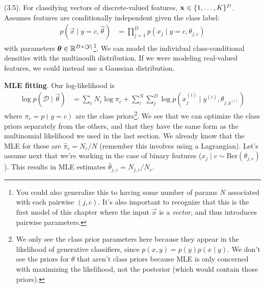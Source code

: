 \documentclass[11pt]{article}
\begin{document}
\myspace
\p {} (3.5). For classifying vectors of discrete-valued features, $\mathbf{x}_{} \in \{1, \ldots, K\}^D$. Assumes features are conditionally independent given the class label:
\begin{align}
	p(\vec x \mid y=c, \vec\theta) 
		&= \prod_{j=1}^{D} p(x_j \mid y=c, \theta_{j,c})
\end{align}
with parameters $\bm{\theta}_{} \in \mathbb{R}^{D \times |\mathcal Y|}$\footnote{You could also generalize this to having some number of params $N$ associated with each pairwise $(j, c)$. It's also important to recognize that this is the first model of this chapter where the input $\vec x$ is a \textit{vector}, and thus introduces pairwise parameters.}. We can model the individual class-conditional densities with the multinoulli distribution. If we were modeling real-valued features, we could instead use a Gaussian distribution.
\begin{compactitem}
	\item \textbf{MLE fitting}. Our log-likelihood is
	\begin{align}
		\log p(\mathcal D \mid \vec\theta)
			&= \sum_{c} N_c \log \pi_c + \sum_i^N \sum_j^D \log p(x^{(i)}_j \mid y^{(i)}, \theta_{j, y^{(i)}})
	\end{align}
	where $\pi_c = p(y=c)$ are the class priors\footnote{We only see the class prior parameters here because they appear in the likelihood of generative classifiers, since $p(x, y) = p(y) p(x \mid y)$. We don't see the priors for $\theta$ that aren't class priors because MLE is only concerned with maximizing the likelihood, not the posterior (which would contain those priors).}. We see that we can optimize the class priors separately from the others, and that they have the same form as the multinomial likelihood we used in the last section. We already know that the MLE for these are $\hat{\pi}_c = N_c / N$ (remember this involves using a Lagrangian). Let's assume next that we're working in the case of binary features ($x_j\mid c \sim \text{Ber}(\theta_{j,c})$). This results in MLE estimates $\hat{\theta}_{j,c} = N_{j,c}/N_c$. 
\end{compactitem}


\clearpage
{}
\end{document}
